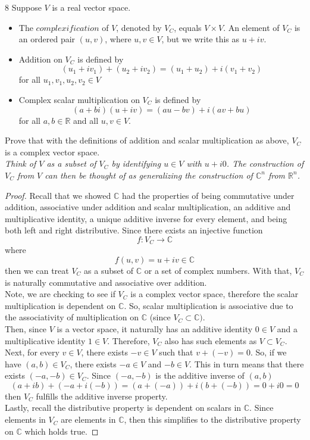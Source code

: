 \documentclass[12pt]{article}
\newenvironment{problem}[1]{\begin{prob*}{#1}{}}{\end{prob*}}
\newcommand{\R}{\mathbb{R}}
\newcommand{\C}{\mathbb{C}}
\begin{document}
    \begin{problem}{8}
        Suppose $V$ is a real vector space.
        \begin{itemize}
            \item The $\textit{complexification}$ of $V$, denoted by $V_C$, equals $V\times V$. An element of $V_C$ is an ordered pair $(u,v)$, where $u,v\in V$, but we write this as $u+iv$.
            \item Addition on $V_C$ is defined by
            \[(u_1+iv_1)+(u_2+iv_2)=(u_1+u_2)+i(v_1+v_2)\]
            for all $u_1,v_1,u_2,v_2\in V$
            \item Complex scalar multiplication on $V_C$ is defined by
            \[(a+bi)(u+iv)=(au-bv)+i(av+bu)\]
            for all $a,b\in \R$ and all $u,v\in V$.
        \end{itemize}
        Prove that with the definitions of addition and scalar multiplication as above, $V_C$ is a complex vector space.\\
        \textit{Think of $V$ as a subset of $V_C$ by identifying $u\in V$ with $u+i0$. The construction of $V_C$ from $V$ can then be thought of as generalizing the construction of $\C^n$ from $\R ^n$. }
    \end{problem}
    \begin{proof}
    Recall that we showed $\C$ had the properties of being commutative under addition, associative under addition and scalar multiplication, an additive and multiplicative identity, a unique additive inverse for every element, and being both left and right distributive. Since there exists an injective function
    \[f:V_C\to \C\]
    where \[f(u,v)=u+iv\in \C\]
    then we can treat $V_C$ as a subset of $\C$ or a set of complex numbers. With that, $V_C$ is naturally commutative and associative over addition. 
    \\Note, we are checking to see if $V_C$ is a complex vector space, therefore the scalar multiplication is dependent on $\C$. So, scalar multiplication is associative due to the associativity of multiplication on $\C$ (since $V_C\subset \C)$. 
    \\Then, since $V$ is a vector space, it naturally has an additive identity $0\in V$ and a multiplicative identity $1\in V$. Therefore, $V_C$ also has such elements as $V\subset V_C$.
    \\Next, for every $v\in V$, there exists $-v\in V$ such that $v+(-v)=0$. So, if we have $(a,b)\in V_C$, there exists $-a\in V$ and $-b\in V$. This in turn means that there exists $(-a,-b)\in V_C$. Since $(-a,-b)$ is the additive inverse of $(a,b)$
    \[(a+ib)+(-a+i(-b))=(a+(-a))+i(b+(-b))=0+i0=0\]
    then $V_C$ fulfills the additive inverse property.
    \\Lastly, recall the distributive property is dependent on scalars in $\C$. Since elements in $V_C$ are elements in $\C$, then this simplifies to the distributive property on $\C$ which holds true.
    
    \end{proof}
\end{document}
